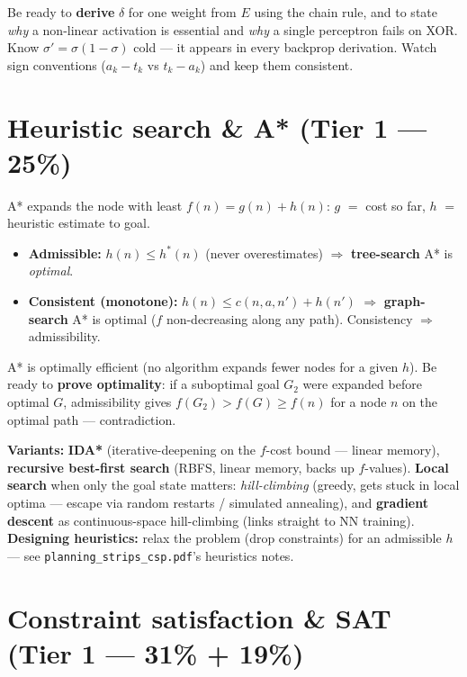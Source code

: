 \documentclass[11pt,a4paper]{article}
\begin{document}
\begin{gotcha}
Be ready to \textbf{derive} $\delta$ for one weight from $E$ using the chain rule, and to state \emph{why} a non-linear activation is essential and \emph{why} a single perceptron fails on XOR. Know $\sigma'=\sigma(1-\sigma)$ cold --- it appears in every backprop derivation. Watch sign conventions ($a_k-t_k$ vs $t_k-a_k$) and keep them consistent.
\end{gotcha}

\section{Heuristic search \& A* (Tier 1 --- 25\%)}

\begin{must}
A* expands the node with least $f(n)=g(n)+h(n)$: $g$ $=$ cost so far, $h$ $=$ heuristic estimate to goal.
\begin{itemize}[leftmargin=*,itemsep=0pt]
  \item \textbf{Admissible:} $h(n)\le h^*(n)$ (never overestimates) $\Rightarrow$ \textbf{tree-search} A* is \emph{optimal}.
  \item \textbf{Consistent (monotone):} $h(n)\le c(n,a,n')+h(n')$ $\Rightarrow$ \textbf{graph-search} A* is optimal ($f$ non-decreasing along any path). Consistency $\Rightarrow$ admissibility.
\end{itemize}
A* is optimally efficient (no algorithm expands fewer nodes for a given $h$). Be ready to \textbf{prove optimality}: if a suboptimal goal $G_2$ were expanded before optimal $G$, admissibility gives $f(G_2)>f(G)\ge f(n)$ for a node $n$ on the optimal path --- contradiction.
\end{must}

\begin{useful}
\textbf{Variants:} \textbf{IDA*} (iterative-deepening on the $f$-cost bound --- linear memory), \textbf{recursive best-first search} (RBFS, linear memory, backs up $f$-values). \textbf{Local search} when only the goal state matters: \emph{hill-climbing} (greedy, gets stuck in local optima --- escape via random restarts / simulated annealing), and \textbf{gradient descent} as continuous-space hill-climbing (links straight to NN training). \textbf{Designing heuristics:} relax the problem (drop constraints) for an admissible $h$ --- see \texttt{planning\_strips\_csp.pdf}'s heuristics notes.
\end{useful}

\section{Constraint satisfaction \& SAT (Tier 1 --- 31\% + 19\%)}
\end{document}
